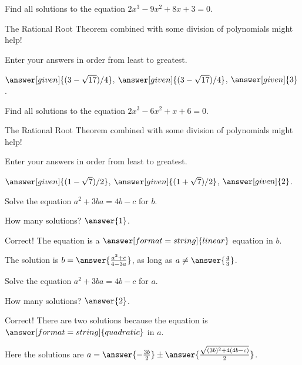 \documentclass[nooutcomes]{ximera}
\begin{document}
\begin{problem}
Find all solutions to the equation $2x^3-9x^2+8x+3=0$. 
\begin{hint} 
The Rational Root Theorem combined with some division of polynomials might help!
\end{hint}
Enter your answers in order from least to greatest.
\begin{prompt}
$\answer[given]{(3-\sqrt{17})/4}$, $\answer[given]{(3-\sqrt{17})/4}$, $\answer[given]{3}$.
\end{prompt}
\end{problem}


\begin{problem}
Find all solutions to the equation $2x^3-6x^2+x+6=0$. 
\begin{hint} 
The Rational Root Theorem combined with some division of polynomials might help!
\end{hint}
Enter your answers in order from least to greatest.
\begin{prompt}
$\answer[given]{(1-\sqrt{7})/2}$, $\answer[given]{(1+\sqrt{7})/2}$, $\answer[given]{2}$.
\end{prompt}
\end{problem}

\begin{problem}

Solve the equation $a^2+3ba = 4b - c$ for $b$. 

How many solutions? $\answer{1}$.

\begin{problem}
Correct!  The equation is a $\answer[format=string]{linear}$ equation in $b$.  

The solution is $b=\answer{\frac{a^2 + c}{4 - 3 a}}$, as long as $a\ne\answer{\frac{4}{3}}$.  
\end{problem}
\end{problem}


\begin{problem}
Solve the equation $a^2+3ba = 4b - c$ for $a$. 

How many solutions? $\answer{2}$.
\begin{problem}
Correct!  There are two solutions because the equation is $\answer[format=string]{quadratic}$ in $a$.  

Here the solutions are $a=\answer{-\frac{3b}{2}}\pm \answer{\frac{\sqrt{(3b)^2 + 4(4b-c)}}{2}}$.  
\end{problem}
\end{problem}
\end{document}
